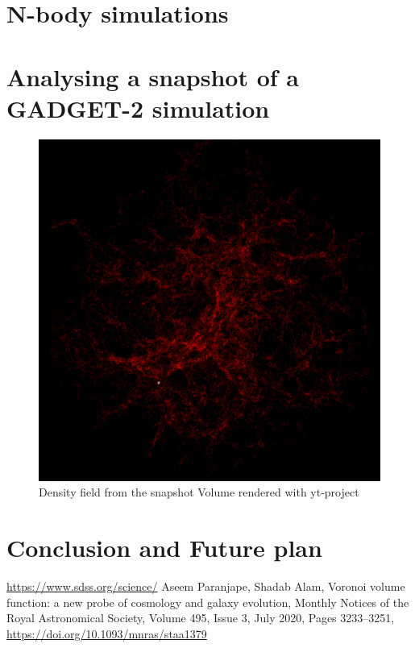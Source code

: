 \documentclass[12pt,twocolumn]{article}
\begin{document}
\section{N-body simulations}

%


\section{Analysing a snapshot of a GADGET-2 simulation}
\cite{aseem_shadab}

\begin{figure}[H]
	\centering
	\includegraphics[width=0.9\linewidth]{../density_assign/UniformGridData_Render_density}
	\caption{Density field from the snapshot \quad
		 Volume rendered with yt-project}
	\label{fig:uniformgriddatarenderdensity}
\end{figure}


\section{Conclusion and Future plan}




\begin{thebibliography}{widest entry}
 \url{https://www.sdss.org/science/}
 Aseem Paranjape, Shadab Alam, Voronoi volume function: a new probe of cosmology and galaxy evolution, Monthly Notices of the Royal Astronomical Society, Volume 495, Issue 3, July 2020, Pages 3233–3251, \url{https://doi.org/10.1093/mnras/staa1379}
\end{thebibliography}
\end{document}
